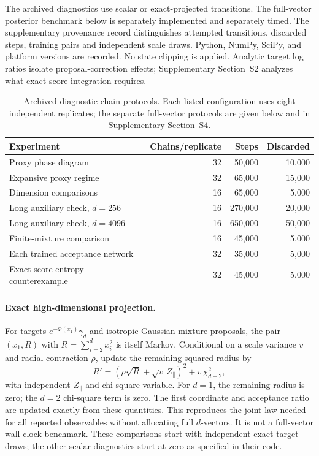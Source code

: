 \documentclass[pdflatex,iicol,sn-mathphys-ay]{sn-jnl}
\theoremstyle{definition}\newtheorem{definition}[theorem]{Definition}
\theoremstyle{remark}\newtheorem{remark}[theorem]{Remark}
\numberwithin{equation}{section}
\newcommand{\1}{\mathbf 1}
\begin{document}
The archived diagnostics use scalar or exact-projected transitions. The full-vector posterior benchmark below is separately implemented and separately timed. The supplementary provenance record distinguishes attempted transitions, discarded steps, training pairs and independent scale draws. Python, NumPy, SciPy, and platform versions are recorded. No state clipping is applied. Analytic target log ratios isolate proposal-correction effects; Supplementary Section~S2 analyzes what exact score integration requires.

\begin{table}[t]\centering\small
\caption{Archived diagnostic chain protocols. Each listed configuration uses eight independent replicates; the separate full-vector protocols are given below and in Supplementary Section~S4.}
\begin{tabular}{@{}p{.36\linewidth}rrr@{}}\toprule
Experiment & Chains/replicate & Steps & Discarded\\\midrule
Proxy phase diagram &32&50,000&10,000\\
Expansive proxy regime &32&65,000&15,000\\
Dimension comparisons &16&65,000&5,000\\
Long auxiliary check, $d=256$ &16&270,000&20,000\\
Long auxiliary check, $d=4096$ &16&650,000&50,000\\
Finite-mixture comparison &16&45,000&5,000\\
Each trained acceptance network &32&35,000&5,000\\
Exact-score entropy counterexample &32&45,000&5,000\\\bottomrule
\end{tabular}
\label{tab:protocols}
\end{table}

\paragraph{Exact high-dimensional projection.}
For targets $e^{-\Phi(x_1)}\gamma_d$ and isotropic Gaussian-mixture proposals, the pair
$(x_1,R)$ with $R=\sum_{i=2}^dx_i^2$ is itself Markov. Conditional on a scale variance $v$ and radial contraction $\rho$, update the remaining squared radius by
\begin{equation}
R'=(\rho\sqrt R+\sqrt v\,Z_\parallel)^2+v\,\chi^2_{d-2},\label{eq:projection}
\end{equation}
with independent $Z_\parallel$ and chi-square variable. For $d=1$, the remaining radius is zero; the $d=2$ chi-square term is zero. The first coordinate and acceptance ratio are updated exactly from these quantities. This reproduces the joint law needed for all reported observables without allocating full $d$-vectors. It is not a full-vector wall-clock benchmark. These comparisons start with independent exact target draws; the other scalar diagnostics start at zero as specified in their code.
\end{document}
